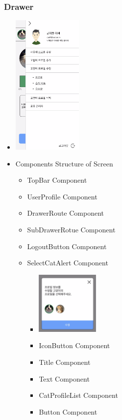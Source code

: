 \documentclass[conference]{IEEEtran}
\begin{document}
\subsubsection{Drawer}
\begin{itemize}
    \item[] \includegraphics[width=0.27\textwidth]{img/Screen/17_Drawer.png}
    \item Components Structure of Screen
    \begin{itemize}
        \item TopBar Component
        \item UserProfile Component
        \item DrawerRoute Component
        \item SubDrawerRotue Component
        \item LogoutButton Component
        \item SelectCatAlert Component
        \begin{itemize}
            \item[] \includegraphics[width=0.27\textwidth]{img/Screen/18_CatAlert.png}
            \item IconButton Component
            \item Title Component
            \item Text Component
            \item CatProfileList Component
            \item Button Component

\end{itemize}
\end{itemize}
\end{itemize}
\end{document}
